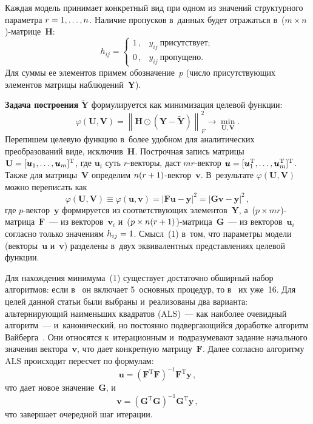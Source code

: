 \begin{multicols}{2}
Каждая модель принимает конкретный вид при одном из значений 
структурного параметра $r\hm= 1, \ldots , n$. Наличие пропусков в~данных 
будет отражаться в~($m\times n$)-мат\-ри\-це~$\mathbf{H}$:
$$
h_{ij}= \begin{cases}
1\,, & y_{ij}\ \mbox{присутствует};\\
0\,, & y_{ij}\ \mbox{пропущено}.
\end{cases}
$$
Для суммы ее элементов примем обозначение~$p$ (чис\-ло присутствующих 
элементов матрицы наблюдений~$\mathbf{Y}$).
     
     \textbf{Задача построения} $\tilde{\mathbf{Y}}$ формулируется как 
минимизация целевой функции:
     $$
     \varphi(\mathbf{U},\mathbf{V})= \left \| \mathbf{H}\odot \left( \mathbf{Y} -
\tilde{\mathbf{Y}}\right) \right \|_F^2\to \min\limits_{\mathbf{U},\mathbf{V}}.
     $$
Перепишем целевую функцию в~более удобном для аналитических 
преобразований виде, исключив~$\mathbf{H}$. Построчная запись матрицы 
$\mathbf{U}\hm= [\bm{u}_1, \ldots , \bm{u}_m]^{\mathrm{T}}$, где $\bm{u}_i$ суть 
$r$-век\-то\-ры, даст $mr$-век\-тор $\bm{u}\hm= [\bm{u}_1^{\mathrm{T}}, \ldots , 
\bm{u}^{\mathrm{T}}_m]^{\mathrm{T}}$. Также для матрицы~$\mathbf{V}$ определим  
$n(r\hm+1)$-век\-тор~$\bm{v}$. В~результате $\varphi(\mathbf{U}, 
\mathbf{V})$ можно переписать как
\begin{equation}
\varphi(\mathbf{U}, \mathbf{V}) \equiv \varphi (\bm{u}, \bm{v})=\left\vert 
\mathbf{F}\bm{u}-\bm{y}\right\vert^2 =\left\vert \mathbf{G}\bm{v}-
\bm{y}\right\vert^2\,,
\end{equation}
где $p$-вектор~$\bm{y}$ формируется из соответствующих 
элементов~$\mathbf{Y}$, а~($p\times mr$)-мат\-ри\-ца~$\mathbf{F}$~--- из 
векторов~$\bm{v}_i$ и~($p\times n(r\hm+1)$)-мат\-ри\-ца~$\mathbf{G}$~--- из 
векторов~$\bm{u}_i$ согласно только значениям $h_{ij}\hm=1$. Смысл~(1) 
в~том, что параметры модели (векторы~$\bm{u}$ и~$\bm{v}$) разделены 
в~двух эквивалентных представлениях целевой функции.
     
     Для нахождения минимума~(1) существует достаточно обширный набор 
алгоритмов: если в~\cite{1-kri} он включает 5~основных процедур, то 
 в~\cite{2-kri} их уже~16. Для целей данной статьи были выбраны 
и~реализованы два варианта: альтернирующий наименьших квадратов (ALS)~--- как наиболее очевидный алгоритм~--- 
и~канонический, но постоянно подвергающийся доработке алгоритм 
Вайберга~\cite{3-kri}. Они относятся к~итерационным и~подразумевают задание 
начального значения вектора~$\bm{v}$, что дает конкретную матрицу~$\mathbf{F}$. 
Далее согласно алгоритму ALS происходит пересчет по формулам:
     \begin{equation}
     \bm{u}=\left( \mathbf{F}^{\mathrm{T}}\mathbf{F}\right)^{-1} \mathbf{F}^{\mathrm{T}} \bm{y}\,,
     \end{equation}
     что дает новое значение~$\mathbf{G}$, и
     $$
     \bm{v}= \left( \mathbf{G}^{\mathrm{T}}\mathbf{G}\right)^{-1}\mathbf{G}^{\mathrm{T}} \bm{y}\,,
     $$ 
     что завершает очередной шаг итерации.
     

\end{multicols}
